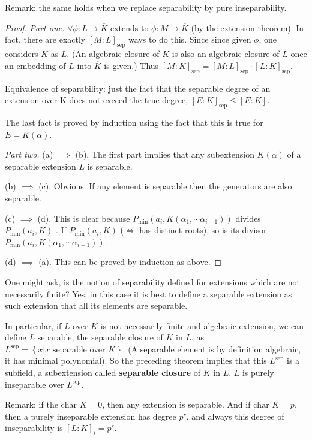 Remark: the same holds when we replace separability by pure inseparability.

\begin{proof}

\textit{Part one.} $\forall \phi: L \to \overbar{K}$ extends to $\widetilde{\phi}: M \to \overbar{K}$ (by the extension theorem). In fact, there are exactly $[M:L]_{\text{sep}}$ ways to do this. Since since given $\phi$, one considers $\overbar{K}$ as $\overbar{L}$. (An algebraic closure of
$K$ is also an algebraic closure of $L$ once an embedding of $L$ 
into $\overbar{K}$ is given.) Thus $[M:K]_{\text{sep}} = [M:L]_{\text{sep}}\cdot [L:K]_{\text{sep}}$.

Equivalence of separability: just the fact that the separable degree of an extension over K does not exceed the true degree, $[E:K]_{\text{sep}}\leq[E:K]$.

The last fact is proved by induction using the fact that this is true for $E=K(\alpha)$.

\textit{Part two.} (a) $\implies$ (b). The first part implies that any subextension $K(\alpha)$ of a separable extension $L$ is separable.

(b) $\implies$ (c). Obvious. If any element is separable then the generators are also separable.

(c) $\implies$ (d). This is clear because $P_{\text{min}}(a_i,K(\alpha_1,\cdots\alpha_{i-1}))$ divides $P_{\text{min}}(a_i,K)$ . If $P_{\text{min}}(a_i,K)$ ($\iff$ has distinct roots), so is its divisor $P_{\text{min}}(a_i,K(\alpha_1,\cdots\alpha_{i-1}))$.

(d) $\implies$ (a). This can be proved by induction as above.
\end{proof}

One might ask, is the notion of separability defined for extensions which are not necessarily finite? Yes, in this case it is best to define a separable extension as such extension that all its elements are separable. 

In particular, if $L$ over $K$ is not necessarily finite and algebraic extension, we can define $L$ separable, the separable closure of $K$ in $L$, as $L^{\text{sep}}=\left\{ x|x\text{ separable over }K\right\}$. (A separable element is by definition algebraic, it has minimal polynomial). So the preceding theorem implies that this $L^{\text{sep}}$ is a subfield, a subextension called \textbf{separable closure} of $K$ in $L$. $L$ is purely inseparable over $L^{\text{sep}}$. 

Remark: if the $\text{char }K=0$, then any extension is separable. And if  $\text{char }K=p$, then a purely inseparable extension has degree $p^r$, and always this degree of inseparability is $[L:K]_i=p^r$.

